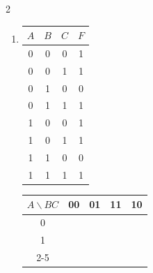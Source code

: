 \documentclass[12pt,a4paper]{article}
\begin{document}
\begin{multicols}{2}
\begin{enumerate}[label=\alph*)]
  \item \begin{minipage}[t]{\linewidth}
    \begin{center}
      \begin{tabular}{ccc|c}
        \toprule
        $A$ & $B$ & $C$ & $F$ \\
        \midrule
        0 & 0 & 0 & 1 \\
        0 & 0 & 1 & 1 \\
        0 & 1 & 0 & 0 \\
        0 & 1 & 1 & 1 \\
        1 & 0 & 0 & 1 \\
        1 & 0 & 1 & 1 \\
        1 & 1 & 0 & 0 \\
        1 & 1 & 1 & 1 \\
        \bottomrule
      \end{tabular}
    \end{center}

    \begin{center}
      \begin{tabular}{c|c|c|c|c|}
        $A \backslash BC$ & 00 & 01 & 11 & \multicolumn{1}{c}{10} \\
        \hline
        0 & \phantom{0} & \phantom{0} & \phantom{0} & \phantom{0} \\
        \hline
        1 & \phantom{0} & \phantom{0} & \phantom{0} & \phantom{0} \\
        \cline{2-5}
      \end{tabular}
    \end{center}
  \end{minipage}


\end{enumerate}
\end{multicols}
\end{document}
